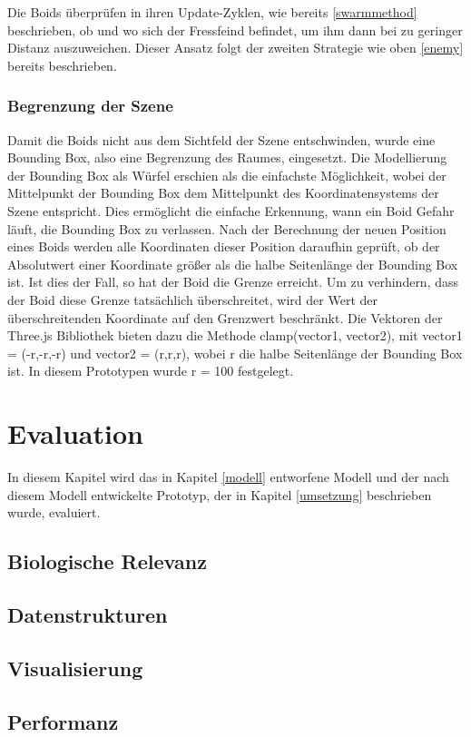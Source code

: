 \documentclass[draft=false
              ,paper=a4
              ,twoside=false
              ,fontsize=11pt
              ,headsepline
              ,BCOR10mm
              ,DIV11
              ,bibtotoc
              ,liststotoc
              ]{scrbook}
\begin{document}
Die Boids überprüfen in ihren Update-Zyklen, wie bereits \ref{swarmmethod} beschrieben, ob und wo sich der Fressfeind befindet, um ihm dann bei zu geringer Distanz auszuweichen. Dieser Ansatz folgt der zweiten Strategie wie oben \ref{enemy} bereits beschrieben.
\subsection{Begrenzung der Szene}\label{box}
Damit die Boids nicht aus dem Sichtfeld der Szene entschwinden, wurde eine Bounding Box, also eine Begrenzung des Raumes, eingesetzt. Die Modellierung der Bounding Box als Würfel erschien als die einfachste Möglichkeit, wobei der Mittelpunkt der Bounding Box dem Mittelpunkt des Koordinatensystems der Szene entspricht. Dies ermöglicht die einfache Erkennung, wann ein Boid Gefahr läuft, die Bounding Box zu verlassen. Nach der Berechnung der neuen Position eines Boids werden alle Koordinaten dieser Position daraufhin geprüft, ob der Absolutwert einer Koordinate größer als die halbe Seitenlänge der Bounding Box ist. Ist dies der Fall, so hat der Boid die Grenze erreicht. Um zu verhindern, dass der Boid diese Grenze tatsächlich überschreitet, wird der Wert der überschreitenden Koordinate auf den Grenzwert beschränkt. Die Vektoren der Three.js Bibliothek bieten dazu die Methode clamp(vector1, vector2), mit vector1 = (-r,-r,-r) und vector2 = (r,r,r), wobei r die halbe Seitenlänge der Bounding Box ist. In diesem Prototypen wurde r = 100 festgelegt.

\chapter{Evaluation}\label{eval}
In diesem Kapitel wird das in Kapitel \ref{modell} entworfene Modell und der nach diesem Modell entwickelte Prototyp, der in Kapitel \ref{umsetzung} beschrieben wurde, evaluiert.
\section{Biologische Relevanz}
\section{Datenstrukturen}
\section{Visualisierung}
\section{Performanz}
\end{document}

